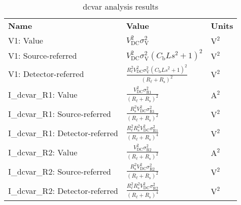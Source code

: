 \begin{table}[H]
\centering
\begin{tabular}[c]{lll}
\textbf{Name} & \textbf{Value} & \textbf{Units} \\ 
\rowcolor{myyellow}
\small{V1: Value} &$V_{\mathrm{DC}}^{2} \sigma_{\mathrm{V}}^{2}$ &$\mathrm{V^2}$ \\ 
\small{V1: Source-referred} &$V_{\mathrm{DC}}^{2} \sigma_{\mathrm{V}}^{2} \left(C_{\mathrm{b}} L s^{2} + 1\right)^{2}$ &$\mathrm{V^2}$ \\ 
\rowcolor{myyellow}
\small{V1: Detector-referred} &$\frac{R_{\ell}^{2} V_{\mathrm{DC}}^{2} \sigma_{\mathrm{V}}^{2} \left(C_{\mathrm{b}} L s^{2} + 1\right)^{2}}{\left(R_{\ell} + R_{\mathrm{s}}\right)^{2}}$ &$\mathrm{V^2}$ \\ 
\small{I\_dcvar\_R1: Value} &$\frac{V_{\mathrm{DC}}^{2} \sigma_{\mathrm{R1}}^{2}}{\left(R_{\ell} + R_{\mathrm{s}}\right)^{2}}$ &$\mathrm{A^2}$ \\ 
\rowcolor{myyellow}
\small{I\_dcvar\_R1: Source-referred} &$\frac{R_{\mathrm{s}}^{2} V_{\mathrm{DC}}^{2} \sigma_{\mathrm{R1}}^{2}}{\left(R_{\ell} + R_{\mathrm{s}}\right)^{2}}$ &$\mathrm{V^2}$ \\ 
\small{I\_dcvar\_R1: Detector-referred} &$\frac{R_{\ell}^{2} R_{\mathrm{s}}^{2} V_{\mathrm{DC}}^{2} \sigma_{\mathrm{R1}}^{2}}{\left(R_{\ell} + R_{\mathrm{s}}\right)^{4}}$ &$\mathrm{V^2}$ \\ 
\rowcolor{myyellow}
\small{I\_dcvar\_R2: Value} &$\frac{V_{\mathrm{DC}}^{2} \sigma_{\mathrm{R2}}^{2}}{\left(R_{\ell} + R_{\mathrm{s}}\right)^{2}}$ &$\mathrm{A^2}$ \\ 
\small{I\_dcvar\_R2: Source-referred} &$\frac{R_{\mathrm{s}}^{2} V_{\mathrm{DC}}^{2} \sigma_{\mathrm{R2}}^{2}}{\left(R_{\ell} + R_{\mathrm{s}}\right)^{2}}$ &$\mathrm{V^2}$ \\ 
\rowcolor{myyellow}
\small{I\_dcvar\_R2: Detector-referred} &$\frac{R_{\ell}^{2} R_{\mathrm{s}}^{2} V_{\mathrm{DC}}^{2} \sigma_{\mathrm{R2}}^{2}}{\left(R_{\ell} + R_{\mathrm{s}}\right)^{4}}$ &$\mathrm{V^2}$ \\ 
\end{tabular}
\caption{dcvar analysis results}
\label{tab-dcvar}
\end{table}

